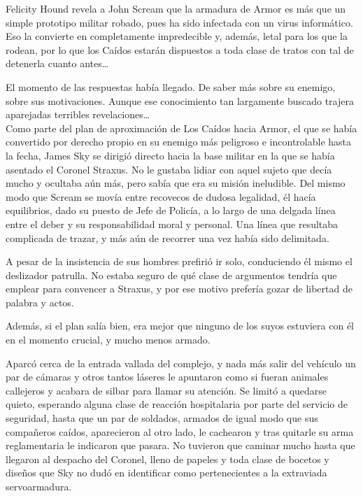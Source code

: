 \begin{prev}
    Felicity Hound revela a John Scream que la armadura de Armor es más que un simple prototipo militar robado, pues ha sido infectada con un virus informático. Eso la convierte en completamente impredecible y, además, letal para los que la rodean, por lo que los Caídos estarán dispuestos a toda clase de tratos con tal de detenerla cuanto antes\dots
\end{prev}

\noindent{}El momento de las respuestas había llegado. De saber más sobre su enemigo, sobre sus motivaciones. Aunque ese conocimiento tan largamente buscado trajera aparejadas terribles revelaciones\dots\\

\noindent{}Como parte del plan de aproximación de Los Caídos hacia Armor, el que se había convertido por derecho propio en su enemigo más peligroso e incontrolable hasta la fecha, James Sky se dirigió directo hacia la base militar en la que se había asentado el Coronel Straxus. No le gustaba lidiar con aquel sujeto que decía mucho y ocultaba aún más, pero sabía que era su misión ineludible. Del mismo modo que Scream se movía entre recovecos de dudosa legalidad, él hacía equilibrios, dado su puesto de Jefe de Policía, a lo largo de una delgada línea entre el deber y su responsabilidad moral y personal. Una línea que resultaba complicada de trazar, y más aún de recorrer una vez había sido delimitada.

A pesar de la insistencia de sus hombres prefirió ir solo, conduciendo él mismo el deslizador patrulla. No estaba seguro de qué clase de argumentos tendría que emplear para convencer a Straxus, y por ese motivo prefería gozar de libertad de palabra y actos.

Además, si el plan salía bien, era mejor que ninguno de los suyos estuviera con él en el momento crucial, y mucho menos armado.

Aparcó cerca de la entrada vallada del complejo, y nada más salir del vehículo un par de cámaras y otros tantos láseres le apuntaron como si fueran animales callejeros y acabara de silbar para llamar su atención. Se limitó a quedarse quieto, esperando alguna clase de reacción hospitalaria por parte del servicio de seguridad, hasta que un par de soldados, armados de igual modo que sus compañeros caídos, aparecieron al otro lado, le cachearon y tras quitarle su arma reglamentaria le indicaron que pasara. No tuvieron que caminar mucho hasta que llegaron al despacho del Coronel, lleno de papeles y toda clase de bocetos y diseños que Sky no dudó en identificar como pertenecientes a la extraviada servoarmadura.

